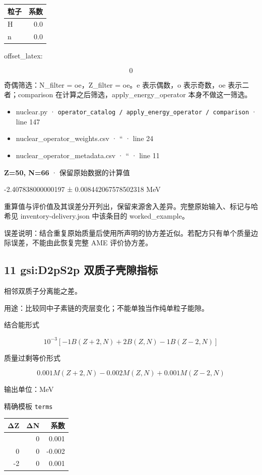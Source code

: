 \documentclass[
  11pt,
  letterpaper,
]{article}
\providecommand{\tightlist}{%
  \setlength{\itemsep}{0pt}\setlength{\parskip}{0pt}}
\begin{document}
\begin{longtable}[]{@{}lr@{}}
\toprule\noalign{}
粒子 & 系数 \\
\midrule\noalign{}
\endhead
\bottomrule\noalign{}
\endlastfoot
H & 0.0 \\
n & 0.0 \\
\end{longtable}

offset\_latex:

\[
0
\]

奇偶筛选：N\_filter = oe，Z\_filter = oe。e 表示偶数，o 表示奇数，oe
表示二者；comparison 在计算之后筛选，apply\_energy\_operator
本身不做这一筛选。

\begin{itemize}
\tightlist
\item
  nuclear.py ·
  \texttt{operator\_catalog\ /\ apply\_energy\_operator\ /\ comparison}
  · line 147
\item
  nuclear\_operator\_weights.csv · `` · line 24
\item
  nuclear\_operator\_metadata.csv · `` · line 11
\end{itemize}

\textbf{Z=50, N=66} · 保留原始数据的计算值

-2.407838000000197 ± 0.008442067578502318 MeV

重算值与评价值及其误差分开列出，保留来源舍入差异。完整原始输入、标记与哈希见
inventory-delivery.json 中该条目的 worked\_example。

误差说明：结合重复原始质量后使用所声明的协方差近似。若配方只有单个质量边际误差，不能由此恢复完整
AME 评价协方差。

\subsection{11 gsi:D2pS2p
双质子壳隙指标}\label{gsid2ps2p-ux53ccux8d28ux5b50ux58f3ux9699ux6307ux6807}

相邻双质子分离能之差。

用途：比较同中子素链的壳层变化；不能单独当作纯单粒子能隙。

结合能形式

\[
10^{-3}[-1B(Z+2,N)+2B(Z,N)-1B(Z-2,N)]
\]

质量过剩等价形式

\[
0.001M(Z+2,N)-0.002M(Z,N)+0.001M(Z-2,N)
\]

输出单位：MeV

精确模板 \texttt{terms}

\begin{longtable}[]{@{}rrr@{}}
\toprule\noalign{}
ΔZ & ΔN & 系数 \\
\midrule\noalign{}
\endhead
\bottomrule\noalign{}
\endlastfoot
2 & 0 & 0.001 \\
0 & 0 & -0.002 \\
-2 & 0 & 0.001 \\
\end{longtable}
\end{document}
